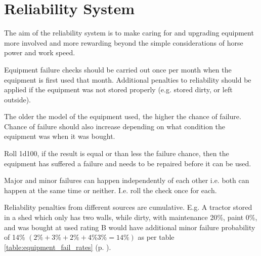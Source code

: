 \documentclass[a4paper,10pt]{article}
\begin{document}
\section{Reliability System}
The aim of the reliability system is to make caring for and upgrading equipment
more involved and more rewarding beyond the simple considerations of horse power
and work speed.

Equipment failure checks should be carried out once per month when the equipment
is first used that month. Additional penalties to reliability should be applied
if the equipment was not stored properly (e.g. stored dirty, or left outside).

The older the model of the equipment used, the higher the chance of failure.
Chance of failure should also increase depending on what condition the equipment
was when it was bought.

Roll 1d100, if the result is equal or than less the failure chance, then the
equipment has suffered a failure and needs to be repaired before it can be used.

Major and minor failures can happen independently of each other i.e. both can
happen at the same time or neither. I.e. roll the check once for each.

Reliability penalties from different sources are cumulative. E.g. A tractor
stored in a shed which only has two walls, while dirty, with maintenance 20\%,
paint 0\%, and was bought at used rating B would have additional minor failure
probability of 14\% $(2\% + 3\% + 2\% + 4\% 3\% = 14\%)$ as per table
\ref{table:equipment_fail_rates} (p. \pageref{table:equipment_fail_rates}).


\begin{table}
  \caption{Repair Cost and Time}
\end{table}
\end{document}
